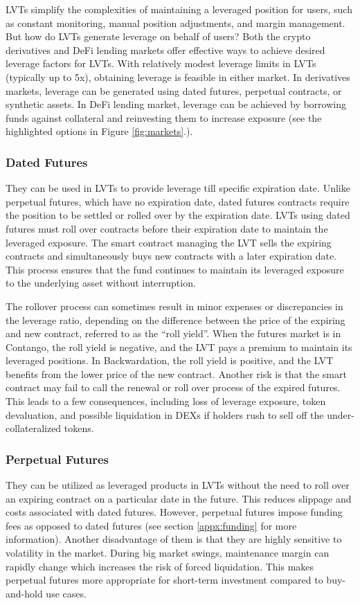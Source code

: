 LVTs simplify the complexities of maintaining a leveraged position for users, such as constant monitoring, manual position adjustments, and margin management. But how do LVTs generate leverage on behalf of users? Both the crypto derivatives and DeFi lending markets offer effective ways to achieve desired leverage factors for LVTs. With relatively modest leverage limits in LVTs (typically up to 5x), obtaining leverage is feasible in either market. In derivatives markets, leverage can be generated using dated futures, perpetual contracts, or synthetic assets. In DeFi lending market, leverage can be achieved by borrowing funds against collateral and reinvesting them to increase exposure (see the highlighted options in Figure \ref{fig:markets}.). 

\subsubsection{Dated Futures}
They can be used in LVTs to provide leverage till specific expiration date. Unlike perpetual futures, which have no expiration date, dated futures contracts require the position to be settled or rolled over by the expiration date. LVTs using dated futures must roll over contracts before their expiration date to maintain the leveraged exposure. The smart contract managing the LVT sells the expiring contracts and simultaneously buys new contracts with a later expiration date. This process ensures that the fund continues to maintain its leveraged exposure to the underlying asset without interruption. 

The rollover process can sometimes result in minor expenses or discrepancies in the leverage ratio, depending on the difference between the price of the expiring and new contract, referred to as the ``roll yield''. When the futures market is in Contango, the roll yield is negative, and the LVT pays a premium to maintain its leveraged positions. In Backwardation, the roll yield is positive, and the LVT benefits from the lower price of the new contract. Another risk is that the smart contract may fail to call the renewal or roll over process of the expired futures. This leads to a few consequences, including loss of leverage exposure, token devaluation, and possible liquidation in DEXs if holders rush to sell off the under-collateralized tokens.

\subsubsection{Perpetual Futures}
They can be utilized as leveraged products in LVTs without the need to roll over an expiring contract on a particular date in the future. This reduces slippage and costs associated with dated futures. However, perpetual futures impose funding fees as opposed to dated futures (see section \ref{appx:funding} for more information). Another disadvantage of them is that they are highly sensitive to volatility in the market. During big market swings, maintenance margin can rapidly change which increases the risk of forced liquidation. This makes perpetual futures more appropriate for short-term investment compared to buy-and-hold use cases.

